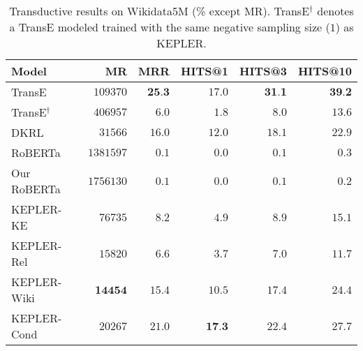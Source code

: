 \begin{table*}[t]
    \tablefont
	\begin{subtable}[h]{0.98\textwidth}
	\centering
	\begin{adjustbox}{max width=0.98\linewidth}
	\begin{tabular}{lrrrrr}
		\toprule
		\textbf{Model} & \textbf{MR} & \textbf{MRR} & \textbf{HITS@1} & \textbf{HITS@3} & \textbf{HITS@10}\\
		\midrule
		TransE \cite{bordes2013translating} & $109370$    & $\textbf{25.3}$ & $17.0$     & $\textbf{31.1}$     & $\textbf{39.2}$     \\
		TransE$^\dagger$ & $406957$ & $6.0$ & $1.8$ & $8.0$ & $13.6$ \\
		DKRL \citep{Xie:2016:RLK:3016100.3016273} & $31566$ & $16.0$ & $12.0$ & $18.1$ & $22.9$  \\
		RoBERTa & $1381597$ & $0.1$ & $0.0$ & $0.1$ & $0.3$ \\
		Our RoBERTa & $1756130$ & $0.1$ & $0.0$ & $0.1$ & $0.2$ \\
		KEPLER-KE & $76735$ & $8.2$ & $4.9$ & $8.9$ & $15.1$ \\
		KEPLER-Rel & $15820$ & $6.6$ & $3.7$ & $7.0$ & $11.7$ \\
		KEPLER-Wiki & $\textbf{14454}$ & $15.4$ & $10.5$ & $17.4$ & $24.4$ \\
		KEPLER-Cond & $20267$ & $21.0$ & $\textbf{17.3}$ & $22.4$ & $27.7$  \\
		\bottomrule
	\end{tabular}
	\end{adjustbox}
	\caption{Transductive results on Wikidata5M (\% except MR). TransE$^\dagger$ denotes a TransE modeled trained with the same negative sampling size ($1$) as KEPLER.}
	\label{tab:trans}
	\end{subtable}
	
	
	\medskip
	

\end{table*}
